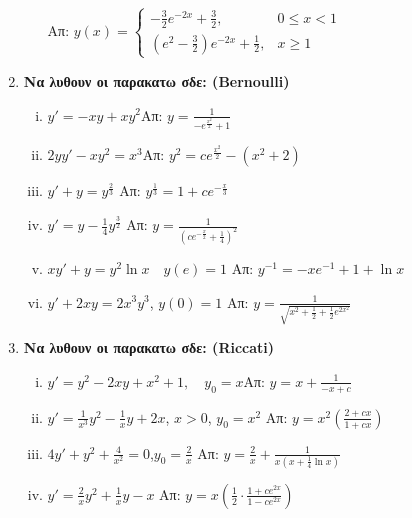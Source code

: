 \begin{enumerate}
\begin{enumerate}
        \hfill  Απ: $y(x)=\begin{cases}-\frac{3}{2}e^{-2x}+\frac{3}{2}, & 0\leq x<1 \\
        \left(e^2-\frac{3}{2}\right)e^{-2x}+\frac{1}{2}, &  x\geq 1\end{cases}$
    \end{enumerate}

  \item {\bfseries Να λυθουν οι παρακατω σδε: (Bernoulli)}
    \begin{enumerate}[i)]
      \item $y'=-xy+xy^2$\hfill Απ: $y=\frac{1}{-e^{\frac{x^2}{2}}+1}$
      \item $2yy'-xy^2=x^3$\hfill Απ: $y^2=ce^{\frac{x^2}{2}}-(x^2+2)$
      \item $y'+y=y^{\frac{2}{3}}$ \hfill Απ: $y^{\frac{1}{3}}=1+ce^{-\frac{x}{3}}$
      \item $ y'=y- \frac{1}{4} y^{\frac{3}{2}} $ 
        \hfill Απ: $ y= \frac{1}{(ce^{- \frac{x}{2}}+ \frac{1}{4} )^{2}}  $ 
      \item $xy'+y=y^{2}\ln x \quad y(e)=1$ \hfill Απ: $y^{-1}=-xe^{-1}+1+\ln x$
      \item $ y'+2xy=2x^{3}y^{3} $, \quad $ y(0)=1 $ 
        \hfill Απ: $ y= \frac{1}{\sqrt{x^{2}+ \frac{1}{2}+ \frac{1}{2} e^{2x^{2}} } } $ 
    \end{enumerate}


  \item {\bfseries Να λυθουν οι παρακατω σδε: (Riccati)}
    \begin{enumerate}[i)]
      \item $y'=y^2-2xy+x^2+1,\quad y_0=x$\hfill Απ: $y=x+\frac{1}{-x+c}$
      \item $ y' = \frac{1}{x^{3}}y^{2} - \frac{1}{x}y + 2x $, $ x>0 $,
        \quad $ y_{0}=x^{2} $ \hfill Απ: $ y=x^{2}\left(\frac{2+cx}{1+cx}\right) $ 
      \item $ 4y'+y^{2}+ \frac{4}{x^{2}} = 0 $,\quad $ y_{0} = \frac{2}{x} $ 
        \hfill Απ: $ y = \frac{2}{x} + \frac{1}{x\left(x+ \frac{1}{4} \ln{x}\right)} $  
      \item $y'=\frac{2}{x}y^2+\frac{1}{x}y-x$
        \hfill Απ: $y=x\left(\frac{1}{2}\cdot\frac{1+ce^{2x}}{1-ce^{2x}}\right)$
    \end{enumerate}


\end{enumerate}
